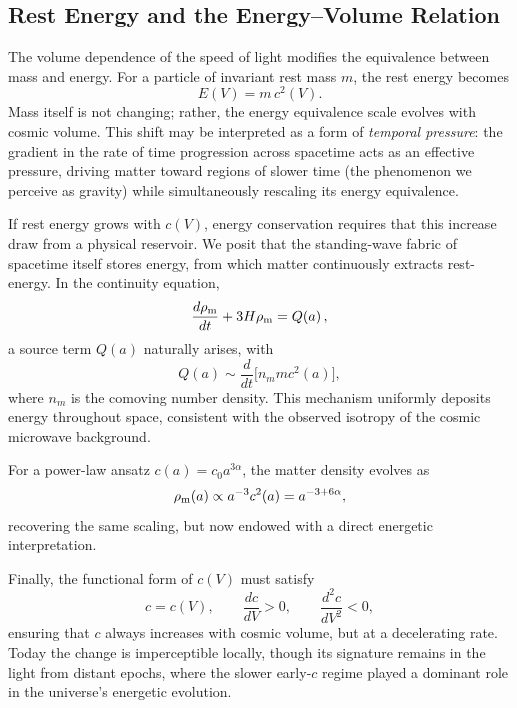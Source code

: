 \documentclass[12pt]{article}
\begin{document}
\subsection{Rest Energy and the Energy--Volume Relation}

The volume dependence of the speed of light modifies the equivalence between mass and energy. For a particle of invariant rest mass \(m\), the rest energy becomes
\begin{equation}
  E(V) = m \, c^2(V).
\end{equation}
Mass itself is not changing; rather, the energy equivalence scale evolves with cosmic volume. This shift may be interpreted as a form of \emph{temporal pressure}: the gradient in the rate of time progression across spacetime acts as an effective pressure, driving matter toward regions of slower time (the phenomenon we perceive as gravity) while simultaneously rescaling its energy equivalence.

If rest energy grows with \(c(V)\), energy conservation requires that this increase draw from a physical reservoir. We posit that the standing-wave fabric of spacetime itself stores energy, from which matter continuously extracts rest-energy. In the continuity equation,
\begin{equation}
\frac{d\rho_{\rm m}}{dt} + 3 H \rho_{\rm m} = Q(a) \, ,
\end{equation}
a source term \(Q(a)\) naturally arises, with
\begin{equation}
Q(a) \sim \frac{d}{dt}\big[n_m m c^2(a)\big],
\end{equation}
where \(n_m\) is the comoving number density. This mechanism uniformly deposits energy throughout space, consistent with the observed isotropy of the cosmic microwave background.

For a power-law ansatz $c(a) = c_0 a^{3\alpha}$, the matter density evolves as
\begin{equation}
\rho_{\rm m}(a) \propto a^{-3} c^2(a) = a^{-3 + 6\alpha},
\end{equation}
recovering the same scaling, but now endowed with a direct energetic interpretation.

Finally, the functional form of \(c(V)\) must satisfy
\begin{equation}
  c = c(V), \qquad \frac{dc}{dV} > 0, \qquad \frac{d^2c}{dV^2} < 0,
\end{equation}
ensuring that \(c\) always increases with cosmic volume, but at a decelerating rate. Today the change is imperceptible locally, though its signature remains in the light from distant epochs, where the slower early-\(c\) regime played a dominant role in the universe’s energetic evolution.
\end{document}
